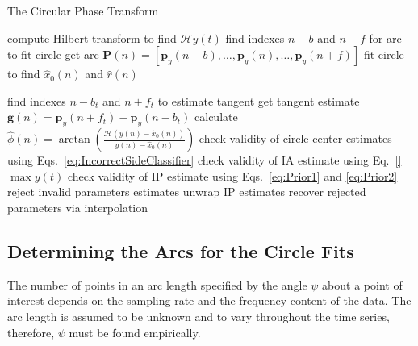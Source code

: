 \documentclass[a4paper]{IEEEtran}
\begin{document}
\begin{algorithm}
\caption{The Circular Phase Transform}\label{CPTAlgorithm}
\begin{algorithmic}[1]
\State compute Hilbert transform to find $\mathcal{H}y(t)$
	\State find indexes $n-b$ and $n+f$ for arc to fit circle
	\State get arc $\mathbf{P}(n) = [\mathbf{p}_y(n-b),\hdots, \mathbf{p}_y(n),\hdots,\mathbf{p}_y(n+f)]$
	\State fit circle to find $\hat{x}_0(n)$ and $\hat{r}(n)$

	\State find indexes $n-b_t$ and $n+f_t$ to estimate tangent 
	\State get tangent estimate $\mathbf{g}(n)= \mathbf{p}_y(n + f_t) - \mathbf{p}_y(n - b_t)$
\EndFor
\State calculate $\hat\phi(n) = \arctan\left(\frac{\mathcal{H}(y(n) - \hat{x}_0(n))}{y(n) - \hat{x}_0(n)}\right)$
\State check validity of circle center estimates using Eqs.~\ref{eq:IncorrectSideClassifier}
\State check validity of IA estimate using Eq.~\ref{} $\max y(t)$
\State check validity of IP estimate using Eqs.~\ref{eq:Prior1} and \ref{eq:Prior2}
\State reject invalid parameters estimates
\State unwrap IP estimates
\State recover rejected parameters via interpolation 
\end{algorithmic}
\end{algorithm}

\subsection{Determining the Arcs for the Circle Fits}\label{sect:FindingArc}
The number of points in an arc length specified by the angle $\psi$ about a point of interest depends on the sampling rate and the frequency content of the data. The arc length is assumed to be unknown and to vary throughout the time series, therefore, $\psi$ must be found empirically.
\end{document}
